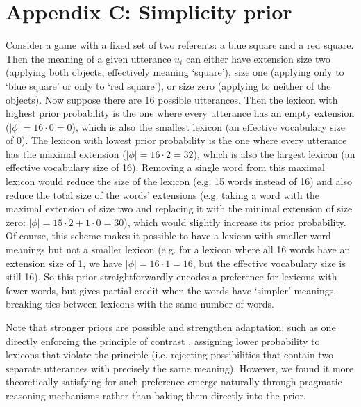\documentclass[10pt, man, floatsintext]{apa7}
\begin{document}
\section*{Appendix C: Simplicity prior}
Consider a game with a fixed set of two referents: a blue square and a red square. Then the meaning of a given utterance $u_i$ can either have extension size two (applying both objects, effectively meaning ‘square’), size one (applying only to ‘blue square’ or only to ‘red square’), or size zero (applying to neither of the objects). Now suppose there are 16 possible utterances. Then the lexicon with highest prior probability is the one where every utterance has an empty extension ($|\phi| = 16 \cdot 0 = 0$), which is also the smallest lexicon (an effective vocabulary size of 0). The lexicon with lowest prior probability is the one where every utterance has the maximal extension ($|\phi| = 16 \cdot 2 = 32$), which is also the largest lexicon (an effective vocabulary size of 16). Removing a single word from this maximal lexicon would reduce the size of the lexicon (e.g. 15 words instead of 16) and also reduce the total size of the words' extensions (e.g. taking a word with the maximal extension of size two and replacing it with the minimal extension of size zero: $|\phi| = 15 \cdot 2 + 1 \cdot 0 = 30$), which would slightly increase its prior probability. Of course, this scheme makes it possible to have a lexicon with smaller word meanings but not a smaller lexicon (e.g. for a lexicon where all 16 words have an extension size of 1, we have $|\phi| = 16 \cdot 1 = 16$, but the effective vocabulary size is still 16). So this prior straightforwardly encodes a preference for lexicons with fewer words, but gives partial credit when the words have ‘simpler’ meanings, breaking ties between lexicons with the same number of words.

Note that stronger priors are possible and strengthen adaptation, such as one directly enforcing the principle of contrast \cite{clark1987principle}, assigning lower probability to lexicons that violate the principle (i.e. rejecting possibilities that contain two separate utterances with precisely the same meaning). However, we found it more theoretically satisfying for such preference emerge naturally through pragmatic reasoning mechanisms rather than baking them directly into the prior. 
\end{document}
